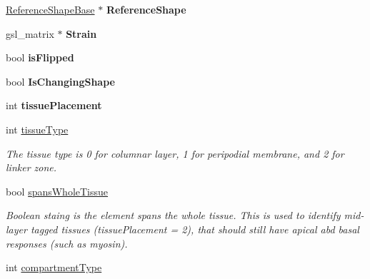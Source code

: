 \begin{DoxyCompactItemize}
\item 
\hypertarget{classShapeBase_a4aee3861aaca88cf1b8e5bdc1ff7c872}{}\hyperlink{classReferenceShapeBase}{Reference\+Shape\+Base} $\ast$ {\bfseries Reference\+Shape}\label{classShapeBase_a4aee3861aaca88cf1b8e5bdc1ff7c872}

\item 
\hypertarget{classShapeBase_a4bda00f80968d836c647afe5f6d1fb36}{}gsl\+\_\+matrix $\ast$ {\bfseries Strain}\label{classShapeBase_a4bda00f80968d836c647afe5f6d1fb36}

\item 
\hypertarget{classShapeBase_a3da6d64116b5d73e2bb27d378035df41}{}bool {\bfseries is\+Flipped}\label{classShapeBase_a3da6d64116b5d73e2bb27d378035df41}

\item 
\hypertarget{classShapeBase_a994acea5e6f2cf92c94f485e7ba5afc9}{}bool {\bfseries Is\+Changing\+Shape}\label{classShapeBase_a994acea5e6f2cf92c94f485e7ba5afc9}

\item 
\hypertarget{classShapeBase_aff63b1fcb823bbfdb5b19fe78dea59b8}{}int {\bfseries tissue\+Placement}\label{classShapeBase_aff63b1fcb823bbfdb5b19fe78dea59b8}

\item 
\hypertarget{classShapeBase_a1d56f7eb3fed744adc268bc4da7a790f}{}int \hyperlink{classShapeBase_a1d56f7eb3fed744adc268bc4da7a790f}{tissue\+Type}\label{classShapeBase_a1d56f7eb3fed744adc268bc4da7a790f}

\begin{DoxyCompactList}\small\item\em The tissue type is 0 for columnar layer, 1 for peripodial membrane, and 2 for linker zone. \end{DoxyCompactList}\item 
\hypertarget{classShapeBase_adafe85bbee6173d2a321408cd8b63db3}{}bool \hyperlink{classShapeBase_adafe85bbee6173d2a321408cd8b63db3}{spans\+Whole\+Tissue}\label{classShapeBase_adafe85bbee6173d2a321408cd8b63db3}

\begin{DoxyCompactList}\small\item\em Boolean staing is the element spans the whole tissue. This is used to identify mid-\/layer tagged tissues (tissue\+Placement = 2), that should still have apical abd basal responses (such as myosin). \end{DoxyCompactList}\item 
\hypertarget{classShapeBase_a47bfa280bf33fc0557e8d804aab3936c}{}int \hyperlink{classShapeBase_a47bfa280bf33fc0557e8d804aab3936c}{compartment\+Type}\label{classShapeBase_a47bfa280bf33fc0557e8d804aab3936c}


\end{DoxyCompactItemize}
